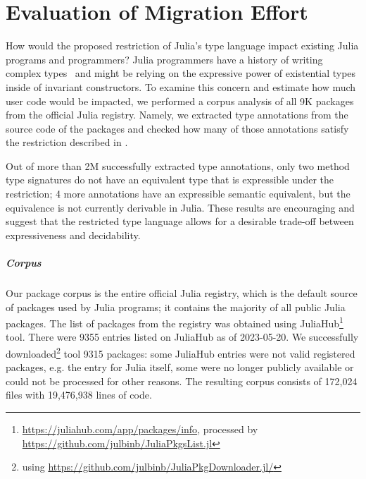 \chapter{Evaluation of Migration Effort}\label{chap:eval}

How would the proposed restriction of Julia's type language
impact existing Julia programs and programmers?
Julia programmers have a history of writing complex
types~\cite{bib:zappa-nardelli:julia-sub:oopsla:2018} and might be relying on
the expressive power of existential types inside of invariant constructors.
To examine this concern and estimate how much user code
would be impacted, we performed a corpus analysis of all 9K packages
from the official Julia registry.
Namely, we extracted type annotations from the source code of the packages
and checked how many of those annotations satisfy the restriction
described in .

Out of more than 2M successfully extracted type annotations, only two
method type signatures
do not have an equivalent type that is expressible under the restriction;
4 more annotations have an expressible semantic equivalent, but the equivalence
is not currently derivable in Julia.
These results are encouraging and suggest that the restricted type language
allows for a desirable trade-off between expressiveness and decidability.

\paragraph{Corpus}
Our package corpus is the entire official Julia registry, which
is the default source of packages used by Julia programs; it contains
the majority of all public Julia packages.
The list of packages from the registry was obtained using JuliaHub\footnote{
\url{https://juliahub.com/app/packages/info}, processed by
\url{https://github.com/julbinb/JuliaPkgsList.jl}} tool. 
There were 9355 entries listed on JuliaHub as of 2023-05-20. %
We successfully downloaded\footnote{using
\url{https://github.com/julbinb/JuliaPkgDownloader.jl/}} tool
9315 packages: some JuliaHub entries were not valid registered packages,
e.g. the entry for Julia itself, some were no longer publicly available
or could not be processed for other reasons.
The resulting corpus consists of 172,024 files with 19,476,938 lines of code.

